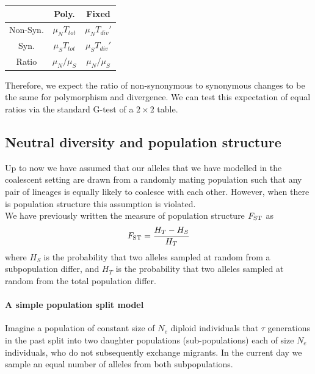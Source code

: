 \begin{center}
\begin{tabular}{ccc}
 & Poly. & Fixed  \\
 \hline
Non-Syn. &    $\mu_N T_{tot}$  &   $\mu_N  T_{div}'$ \\
Syn. &    $\mu_S T_{tot}$   &     $\mu_S  T_{div}'$  \\
Ratio & $\mu_N/\mu_S$  & $\mu_N/\mu_S$
\end{tabular}
\end{center}
Therefore, we expect the ratio of non-synonymous to synonymous changes
to be the same for polymorphism and divergence. We can test this expectation of equal ratios via the standard G-test of a $2
\times 2$ table.

\subsection{Neutral diversity and population structure}
Up to now we have assumed that our alleles that we have modelled in the
coalescent setting are drawn from a randomly mating population such
that any pair of lineages is equally likely to coalesce with each
other. However, when there is population structure this assumption is
violated. \\

We have previously written the measure of population structure
$F_{\mathrm{ST}}$ as
\begin{equation}
F_{\mathrm{ST}} = \frac{H_T-H_S}{H_T}
\end{equation}
where $H_S$ is the probability that two alleles sampled at random from a
subpopulation differ, and $H_T$ is the probability that two alleles
sampled at random from the total population differ. 

\paragraph{A simple population split model}
Imagine a population of constant size of $N_e$ diploid individuals that
$\tau$ generations in the past split into two daughter populations (sub-populations)
each of size $N_e$ individuals, who do not subsequently exchange
migrants. In the current day we sample an equal number of alleles
from both subpopulations.

